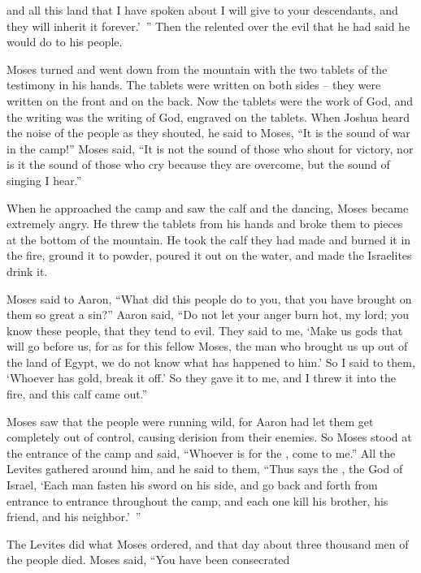{and all
this
land
that
I have
spoken about I will give
to your descendants,
and they will inherit
it forever.’ ”
Then the
{}
relented
over
the evil
that he had
said
he would do
to his people.
\par }{\PP {}Moses
turned
and went down
from
the mountain
with the two
tablets
of the testimony
in his hands.
The tablets
were written
on
both
sides
– they
were written on the front and on the back.
Now the tablets
were the work
of God,
and the writing
was the writing
of God,
engraved
on
the tablets.
When Joshua
heard
the
noise
of the people
as they shouted,
he said
to
Moses,
“It is the sound
of war
in the camp!”
Moses said,
“It is not
the sound
of those who shout
for victory,
nor
is it the sound
of those who cry
because they are overcome,
but the sound
of singing
I
hear.”
\par }{\PP {}When
he approached
the camp
and saw
the
calf
and the dancing,
Moses
became extremely angry.
He threw
the
tablets
from his hands
and broke
them
to pieces at the bottom
of the mountain.
He took
the
calf
they had
made
and burned
it in the fire,
ground it to powder,
poured it out
on
the water,
and made the
Israelites
drink it.
\par }{\PP {}Moses
said
to
Aaron,
“What
did
this
people
do
to you, that
you have brought
on
them so great
a sin?”
Aaron
said,
“Do not
let your anger
burn hot,
my lord;
you
know
these people,
that
they tend
to evil.
They said
to me, ‘Make
us gods
that
will go
before
us, for
as for this
fellow Moses,
the man
who
brought us up
out of the land
of Egypt,
we do not
know
what
has happened to him.’
So I said
to them, ‘Whoever
has gold,
break it off.’
So they gave
it to me, and I threw
it into the fire,
and this
calf
came out.”
\par }{\PP {}Moses
saw
that the people
were running
wild, for
Aaron
had let them get
completely out of control, causing derision from their enemies.
So Moses
stood
at the entrance
of the camp
and said,
“Whoever
is for the
{}, come to
me.” All
the Levites
gathered around him,
and he said
to them, “Thus
says
the {},
the God
of Israel,
‘Each man
fasten
his sword
on
his side,
and go
back
and forth from entrance
to entrance
throughout the camp,
and each
one kill
his brother,
his friend,
and his neighbor.’ ”
\par }{\PP {}The Levites
did what
Moses
ordered, and that day
about three
thousand
men
of the people
died.
Moses
said,
“You have been consecrated
}
